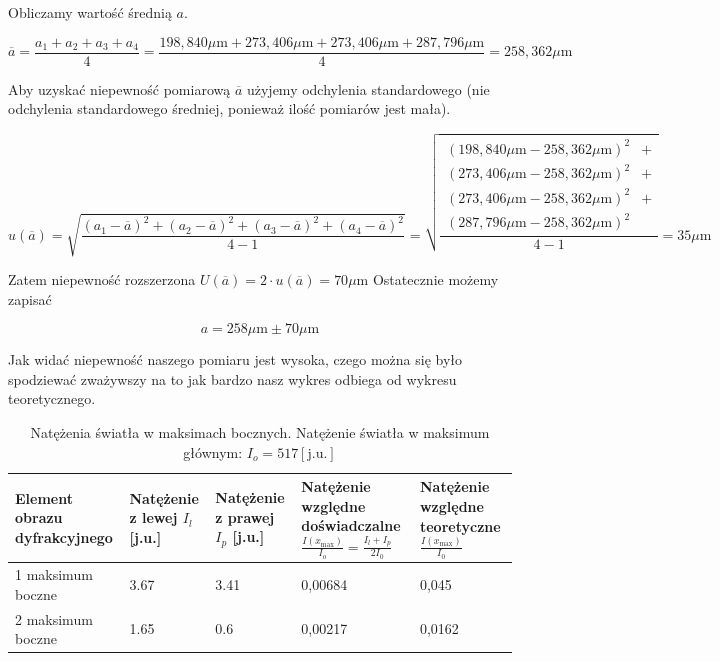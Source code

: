 \documentclass{fizykalab}
\newcommand{\um}{\ensuremath{\mu \text{m}}}
\begin{document}
Obliczamy wartość średnią $a$.

\begin{equation*}
    \overline{a} = \frac{a_1 + a_2 + a_3 + a_4}{4} = \frac{198,840 \um +  273,406 \um +  273,406 \um + 287,796 \um}{4} = 258,362 \um
\end{equation*} 

Aby uzyskać niepewność pomiarową $\overline{a}$ użyjemy odchylenia standardowego
(nie odchylenia standardowego średniej, ponieważ ilość pomiarów jest mała).

\begin{equation*}
    u(\overline{a}) = \sqrt{
         \frac{
             \left(a_1- \overline{a} \right)^2 + 
             \left(a_2- \overline{a} \right)^2 + 
             \left(a_3- \overline{a} \right)^2 +
             \left(a_4- \overline{a} \right)^2
         }{4-1}} =  
         \sqrt{\frac{
             \begin{aligned}\left(198,840 \um - 258,362 \um \right)^2 &+ \\
             \left(273,406 \um - 258,362 \um \right)^2 &+  \\
             \left(273,406 \um - 258,362\um \right)^2  &+  \\
             \left(287,796 \um - 258,362\um \right)^2\end{aligned}
         }{4-1}} =  35 \um
\end{equation*}

Zatem niepewność rozszerzona $U(\overline{a}) = 2\cdot u(\overline{a}) = 70 \um$
Ostatecznie możemy zapisać 

\begin{equation*}
    a = 258\um \pm 70\um 
\end{equation*}

Jak widać niepewność naszego pomiaru jest wysoka, czego można się było 
spodziewać zważywszy na to jak bardzo nasz wykres odbiega od wykresu 
teoretycznego. 
\begin{table}[H]
    \centering
    \caption{Natężenia światła w maksimach bocznych. Natężenie światła w maksimum głównym:
        $I_o = 517 [\text{j.u.}]$
    }
    \begin{tabular}{|C{3.5cm}|C{2cm} | C{2cm}| C{2.5cm} |C{2cm}|}
        \hline
         Element obrazu dyfrakcyjnego&
         Natężenie z lewej $I_l$ [j.u.]&
         Natężenie z prawej $I_p$ [j.u.]& 
         Natężenie względne doświadczalne
         $\frac{I(x_\text{max})}{I_o} = \frac{I_l + I_p}{2I_0}$
         & 
         Natężenie względne teoretyczne  $\frac{I(x_\text{max})}{I_0}$ 
         
         \\  maksimum boczne &
         3.67 & 3.41 & 0,00684 & 0,045 \\  maksimum boczne&
         
         1.65 & 0.6 & 0,00217 & 0,0162 \\ \hline
    \end{tabular}
\end{table}
\end{document}
